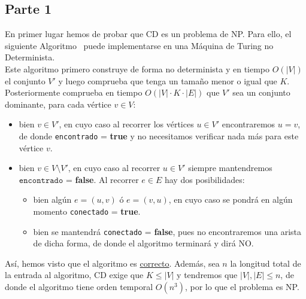 \documentclass[12pt]{article}
\begin{document}
    \subsection{Parte 1}
    \noindent
    En primer lugar hemos de probar que CD es un problema de NP. Para ello, el siguiente Algoritmo~\label{alg} puede implementarse en una Máquina de Turing no Determinista.\\

    \noindent
    Este algoritmo primero construye de forma no determinista y en tiempo $O(|V|)$ el conjunto $V'$ y luego comprueba que tenga un tamaño menor o igual que $K$. Posteriormente comprueba en tiempo $O(|V|\cdot K\cdot |E|)$ que $V'$ sea un conjunto dominante, para cada vértice $v\in V$:
    \begin{itemize}
        \item bien $v\in V'$, en cuyo caso al recorrer los vértices $u\in V'$ encontraremos $u = v$, de donde \texttt{encontrado} = \textbf{true} y no necesitamos verificar nada más para este vértice $v$.
        \item bien $v\in V\setminus V'$, en cuyo caso al recorrer $u\in V'$ siempre mantendremos $\texttt{encontrado}$ = \textbf{false}. Al recorrer $e\in E$ hay dos posibilidades:
            \begin{itemize}
                \item bien algún $e = (u,v)$ ó $e = (v,u)$, en cuyo caso se pondrá en algún momento \texttt{conectado} = \textbf{true}.
                \item bien se mantendrá \texttt{conectado} = \textbf{false}, pues no encontraremos una arista de dicha forma, de donde el algoritmo terminará y dirá NO.
            \end{itemize}
    \end{itemize}
    Así, hemos visto que el algoritmo es \underline{correcto}. Además, sea $n$ la longitud total de la entrada al algoritmo, CD exige que $K\leq |V|$ y tendremos que $|V|, |E| \leq n$, de donde el algoritmo tiene orden temporal $O(n^3)$, por lo que el problema es NP.
\end{document}
